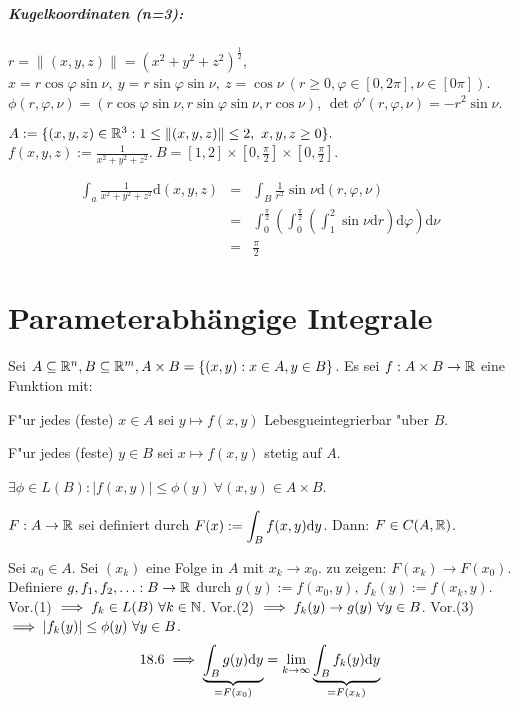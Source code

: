 \documentclass[a4paper,twoside,DIV15,BCOR12mm]{scrbook}
\begin{document}
\paragraph{Kugelkoordinaten (n=3):} $ $\\
$r=\|(x,y,z)\|=(x^2+y^2+z^2)^{\frac{1}{2}}$,\\
$x=r\cos\varphi\sin\nu,\ y=r\sin\varphi\sin\nu,\ z=\cos\nu\ (r\ge 0, \varphi\in[0,2\pi],\nu\in[0\pi])$.\\
$\phi(r,\varphi,\nu)=(r\cos\varphi\sin\nu,r\sin\varphi\sin\nu,r\cos\nu)$, $\det\phi'(r,\varphi,\nu)=-r^2\sin\nu$.
\begin{beispiel}
$A:=\{(x,y,z)\in\mathbb{R}^3: 1\le\|(x,y,z)\|\le 2,\ x,y,z\ge 0\}.$\\
$f(x,y,z):=\frac{1}{x^2+y^2+z^2}.\ B=[1,2]\times[0,\frac{\pi}{2}]\times[0,\frac{\pi}{2}]$.

\begin{eqnarray*}
\int_a\frac{1}{x^2+y^2+z^2}\text{d}(x,y,z)&=&\int_B\frac{1}{r^2}\sin\nu\text{d}(r,\varphi,\nu)\\
&=&\int_0^\frac{\pi}{2}(\int_0^\frac{\pi}{2}(\int_1^2\sin\nu\text{d}r)\text{d}\varphi)\text{d}\nu\\
&=&\frac{\pi}{2}
\end{eqnarray*}
\end{beispiel}


\chapter{Parameterabhängige Integrale}

\begin{satz}
Sei $A\subseteq\mathbb{R}^n, B\subseteq\mathbb{R}^m, A\times B=\{(x,y):x\in A, y\in B\}$.
Es sei $f:A\times B\to\mathbb{R}$ eine Funktion mit:
\begin{liste}
\item F"ur jedes (feste) $x\in A$ sei $y\mapsto f(x,y)$ Lebesgueintegrierbar "uber $B$.
\item F"ur jedes (feste) $y\in B$ sei $x\mapsto f(x,y)$ stetig auf $A$.
\item $\exists \phi\in L(B): |f(x,y)|\le \phi(y)\ \forall (x,y)\in A\times B$.
\end{liste}
$F:A\to\mathbb{R}$ sei definiert durch $F(x):=\displaystyle\int_B f(x,y)\text{d}y$. Dann: $F\in C(A,\mathbb{R})$.
\end{satz}

\begin{beweis}
Sei $x_0\in A$. Sei $(x_k)$ eine Folge in $A$ mit $x_k\to x_0$. zu zeigen: $F(x_k)\to F(x_0)$.\\
Definiere $g,f_1,f_2,\ldots:B\to\mathbb{R}$ durch $g(y):=f(x_0,y),\ f_k(y):=f(x_k,y)$.
Vor.(1) $\implies f_k\in L(B)\ \forall k\in \mathbb{N}$.
Vor.(2) $\folgt f_k(y)\to g(y)\ \forall y\in B$.
Vor.(3) $\implies |f_k(y)|\le \phi(y)\ \forall y\in B$.
\[18.6 \implies \underbrace{\displaystyle\int_B g(y)\text{d}y}_{=F(x_0)}=\lim_{k\to\infty}\underbrace{\int_B f_k(y)\text{d}y}_{=F(x_k)}\]
\end{beweis}
\end{document}
